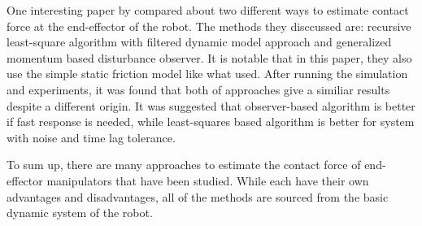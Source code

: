One interesting paper by \cite{Beyl11} compared about two different ways to estimate contact force at the end-effector of the robot. The methods they disccussed are: recursive least-square algorithm with filtered dynamic model approach and generalized momentum based disturbance observer. It is notable that in this paper, they also use the simple static friction model like what \cite{Hao14} used. After running the simulation and experiments, it was found that both of approaches give a similiar results despite a different origin. It was suggested that observer-based algorithm is better if fast response is needed, while least-squares based algorithm is better for system with noise and time lag tolerance.


To sum up, there are many approaches to estimate the contact force of end-effector manipulators that have been studied. While each have their own advantages and disadvantages, all of the methods are sourced from the basic dynamic system of the robot. 
